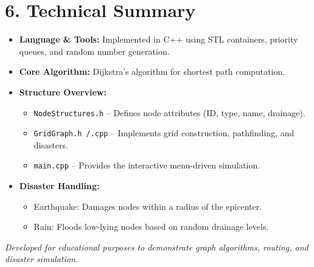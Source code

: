 \documentclass[a4paper,12pt]{article}
\begin{document}
\section*{6. Technical Summary}
\begin{itemize}
    \item \textbf{Language \& Tools:} Implemented in C++ using STL containers, priority queues, and random number generation.
    \item \textbf{Core Algorithm:} Dijkstra’s algorithm for shortest path computation.
    \item \textbf{Structure Overview:}
    \begin{itemize}
        \item \texttt{NodeStructures.h} – Defines node attributes (ID, type, name, drainage).
        \item \texttt{GridGraph.h /.cpp} – Implements grid construction, pathfinding, and disasters.
        \item \texttt{main.cpp} – Provides the interactive menu-driven simulation.
    \end{itemize}
    \item \textbf{Disaster Handling:}
    \begin{itemize}
        \item Earthquake: Damages nodes within a radius of the epicenter.
        \item Rain: Floods low-lying nodes based on random drainage levels.
    \end{itemize}
\end{itemize}

\vfill
\noindent\textit{Developed for educational purposes to demonstrate graph algorithms, routing, and disaster simulation.}
\end{document}
